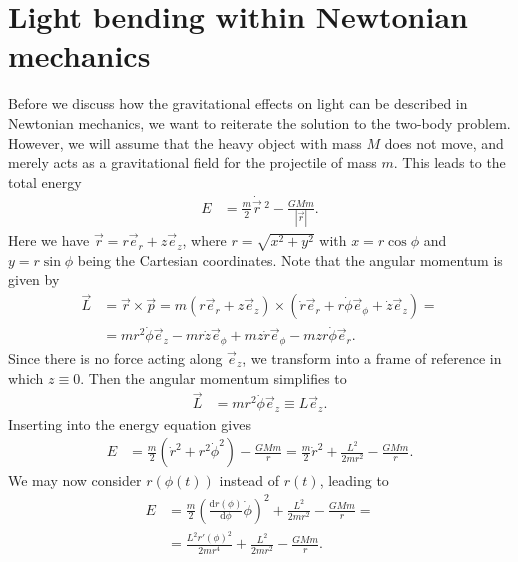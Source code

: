\documentclass[english, parskip=full]{scrartcl}
\title{\titel}
\author{\autor}
\date{\today}
\newcommand{\kla}{}
\newcommand{\tecxt}{}
\begin{document}
\maketitle  %

\section{Light bending within Newtonian mechanics}
Before we discuss how the gravitational effects on light can be described in Newtonian mechanics, we want to reiterate the solution to the two-body problem.
However, we will assume that the heavy object with mass $M$ does not move, and merely acts as a gravitational field for the projectile of mass $m$.
This leads to the total energy
\begin{align}
E &= \frac{m}{2} \dot{\vec{r}}\,^2 - \frac{GMm}{|\vec{r}|}.
\end{align}
Here we have $\vec{r} = r\vec{e}_r + z\vec{e}_z$, where $r = \sqrt{x^2 + y^2}$ with $x = r\cos\phi$ and $y=r\sin\phi$ being the Cartesian coordinates.
Note that the angular momentum is given by
\begin{align}
\vec{L} &= \vec{r} \times \vec{p} = m\kla\left( r\vec{e}_r + z\vec{e}_z \right) \times \kla\left( \dot{r}\vec{e}_r + r\dot{\phi}\vec{e}_\phi + \dot{z}\vec{e}_z \right) = \\
&= mr^2\dot{\phi} \vec{e}_z - mr\dot{z}\vec{e}_\phi + mz\dot{r}\vec{e}_\phi - mz r\dot{\phi} \vec{e}_r.
\end{align}
Since there is no force acting along $\vec{e}_z$, we transform into a frame of reference in which $z \equiv 0$.
Then the angular momentum simplifies to 
\begin{align}
\vec{L} &= mr^2\dot{\phi} \vec{e}_z \equiv L\vec{e}_z.
\end{align}
Inserting into the energy equation gives
\begin{align}
E &= \frac{m}{2} \kla\left(  \dot{r}^2 + r^2\dot{\phi}^2 \right) - \frac{GMm}{r} = \frac{m}{2} \dot{r}^2 + \frac{L^2}{2mr^2} - \frac{GMm}{r}.
\end{align}
We may now consider $r(\phi(t))$ instead of $r(t)$, leading to
\begin{align}
E &= \frac{m}{2} \kla\left( \frac{\tecxt\text{d}r(\phi)}{\tecxt\text{d}\phi} \dot{\phi} \right)^2 + \frac{L^2}{2mr^2} - \frac{GMm}{r} = \\
&= \frac{L^2r'(\phi)^2}{2mr^4}  + \frac{L^2}{2mr^2} - \frac{GMm}{r}.
\end{align}
\end{document}
